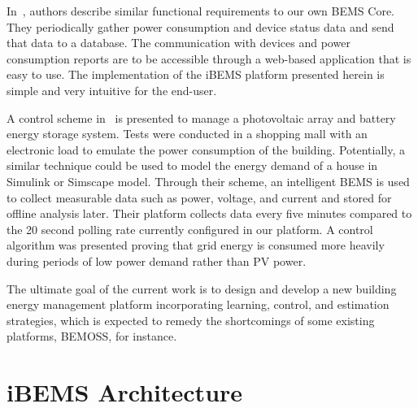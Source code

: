 \documentclass[conference]{IEEEtran}
\begin{document}
In~\cite{8246800}, authors describe similar functional requirements to our
own BEMS Core. They periodically gather power consumption and device status data
and send that data to a database. The communication with devices
and power consumption reports are to be accessible through a web-based
application that is easy to use. The implementation of the iBEMS platform presented herein is simple and very
intuitive for the end-user.  

A control scheme in~\cite{Barchi2018} is presented to manage a photovoltaic
array and battery energy storage system. Tests were conducted in a shopping mall
with an electronic load to emulate the power consumption of the building.
Potentially, a similar technique could be used to model the energy demand of a
house in Simulink or Simscape model. Through their scheme, an intelligent BEMS
is used to collect measurable data such as power, voltage, and current and stored for offline analysis later. Their platform collects data every five minutes compared to the 20 second polling rate currently configured in our platform. A control algorithm was presented proving that grid energy is consumed more heavily during periods of low power demand rather than PV power.



The ultimate goal of the current work is to design and develop a new building energy management
platform incorporating learning, control, and estimation strategies, which is expected to remedy the
shortcomings of some existing platforms, BEMOSS, for instance.

\section{iBEMS Architecture}
\label{sec:iBEMS-Architecture}
\end{document}
